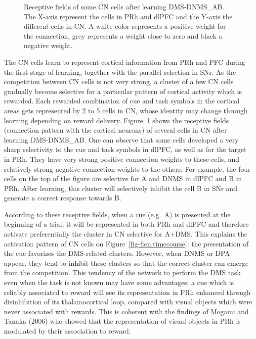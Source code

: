 \documentclass[
  11pt,
  a4paper,
]{scrbook}
\begin{document}
\begin{figure}


\caption{\label{fig-ficn:clusterRF}Receptive fields of some CN cells
after learning DMS-DNMS\_AB. The X-axis represent the cells in PRh and
dlPFC and the Y-axis the different cells in CN. A white color represents
a positive weight for the connection, grey represents a weight close to
zero and black a negative weight.}

\end{figure}%

The CN cells learn to represent cortical information from PRh and PFC
during the first stage of learning, together with the parallel selection
in SNr. As the competition between CN cells is not very strong, a
cluster of a few CN cells gradually become selective for a particular
pattern of cortical activity which is rewarded. Each rewarded
combination of cue and task symbols in the cortical areas gets
represented by 2 to 5 cells in CN, whose identity may change through
learning depending on reward delivery. Figure~\ref{fig-ficn:clusterRF}
shows the receptive fields (connection pattern with the cortical
neurons) of several cells in CN after learning DMS-DNMS\_AB. One can
observe that some cells developed a very sharp selectivity to the cue
and task symbols in dlPFC, as well as for the target in PRh. They have
very strong positive connection weights to these cells, and relatively
strong negative connection weights to the others. For example, the four
cells on the top of the figure are selective for A and DNMS in dlPFC and
B in PRh. After learning, this cluster will selectively inhibit the cell
B in SNr and generate a correct response towards B.

According to these receptive fields, when a cue (e.g.~A) is presented at
the beginning of a trial, it will be represented in both PRh and dlPFC
and therefore activate preferentially the cluster in CN selective for
A+DMS. This explains the activation pattern of CN cells on
Figure~\ref{fig-ficn:timecourse}: the presentation of the cue favorizes
the DMS-related clusters. However, when DNMS or DPA appear, they tend to
inhibit these clusters so that the correct cluster can emerge from the
competition. This tendency of the network to perform the DMS task even
when the task is not known may have some advantages: a cue which is
reliably associated to reward will see its representation in PRh
enhanced through disinhibition of its thalamocortical loop, compared
with visual objects which were never associated with rewards. This is
coherent with the findings of Mogami and Tanaka (2006) who showed that
the representation of visual objects in PRh is modulated by their
association to reward.
\end{document}
